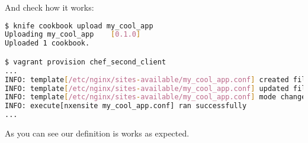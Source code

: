 And check how it works:

\begin{lstlisting}[language=Bash,label=lst:cookbook-definitions-shell1]
$ knife cookbook upload my_cool_app
Uploading my_cool_app    [0.1.0]
Uploaded 1 cookbook.

$ vagrant provision chef_second_client
...
INFO: template[/etc/nginx/sites-available/my_cool_app.conf] created file /etc/nginx/sites-available/my_cool_app.conf
INFO: template[/etc/nginx/sites-available/my_cool_app.conf] updated file contents /etc/nginx/sites-available/my_cool_app.conf
INFO: template[/etc/nginx/sites-available/my_cool_app.conf] mode changed to 644
INFO: execute[nxensite my_cool_app.conf] ran successfully
...
\end{lstlisting}

As you can see our definition is works as expected.